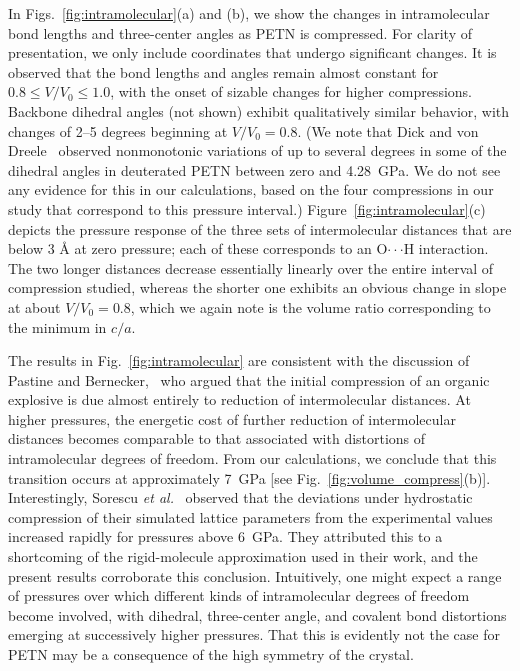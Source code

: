 \documentclass[prb,aps,nobibnotes,twocolumn,doublespace,twocolumngrid,superbib]{revtex4}
\begin{document}
In Figs.~\ref{fig:intramolecular}(a) and (b), we show the changes in
intramolecular bond lengths and three-center angles as PETN is
compressed.  For clarity of presentation, we only include coordinates that
undergo significant changes.  It is observed that the bond lengths and angles
remain almost constant for $ 0.8 \leq V/V_0 \leq 1.0$, with the onset of
sizable changes for higher compressions.  Backbone dihedral angles (not shown)
exhibit qualitatively similar behavior, with changes of 2--5 degrees beginning
at $V/V_0=0.8$. (We note that Dick and von Dreele~\cite{Dick_1997} observed
nonmonotonic variations of up to several degrees in some of the dihedral
angles in deuterated PETN between zero and 4.28~GPa.  We do not see any
evidence for this in our calculations, based on the four compressions in
our study that correspond to this pressure interval.)
Figure~\ref{fig:intramolecular}(c) depicts the pressure response of 
the three sets of intermolecular distances that are below 3 \AA\/ at zero
pressure; each of these corresponds to an O$\cdot\cdot\cdot$H
interaction.  The two longer distances decrease essentially linearly
over the entire interval of compression studied, whereas the shorter
one exhibits an obvious change in slope at about $V/V_0=0.8$, which we
again note is the volume ratio corresponding to the minimum in $c/a$.


The results in Fig.~\ref{fig:intramolecular} are consistent with the
discussion of Pastine and Bernecker,~\cite{Pastine_1974v45} who argued
that the initial compression of an organic explosive is due almost
entirely to reduction of intermolecular distances.  At higher
pressures, the energetic cost of further reduction of intermolecular
distances becomes comparable to that associated with distortions of
intramolecular degrees of freedom.  From our calculations, we conclude
that this transition occurs at approximately 7~GPa [see
Fig.~\ref{fig:volume_compress}(b)].  Interestingly, Sorescu {\it et
al.}~\cite{Sorescu_1999v103} observed that the deviations under
hydrostatic compression of their simulated lattice parameters from the
experimental values increased rapidly for pressures above 6~GPa.  They
attributed this to a shortcoming of the rigid-molecule approximation
used in their work, and the present results corroborate this
conclusion.  Intuitively, one might expect a range of pressures over
which different kinds of intramolecular degrees of freedom become
involved, with dihedral, three-center angle, and covalent bond
distortions emerging at successively higher pressures.  That this is
evidently not the case for PETN may be a consequence of the high
symmetry of the crystal.
\end{document}
